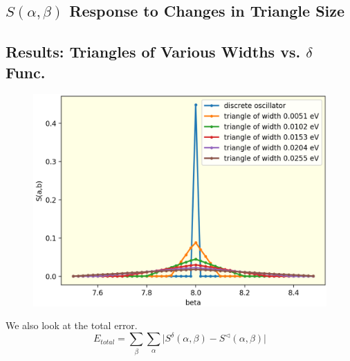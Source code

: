\documentclass[Master.tex]{subfiles}
\begin{document}
    
    \clearpage

  \subsection{$S(\alpha,\beta)$ Response to Changes in Triangle Size}\label{sec:vary_triangle_width}



    \subsection*{Results: Triangles of Various Widths vs. $\delta$ Func.}

    \begin{figure}[h]
      \begin{center}
        \includegraphics[scale=0.6]{diff_widths_alpha_0p5}
        \caption{}
        \label{fig:diff_widths_alpha_0p5}
      \end{center}
    \end{figure}


    We also look at the total error.
    \[E_{total}=\sum_{\beta}\sum_\alpha \Big|S^\delta(\alpha,\beta)-S^\triangleleft(\alpha,\beta)\Big|\]
\end{document}
